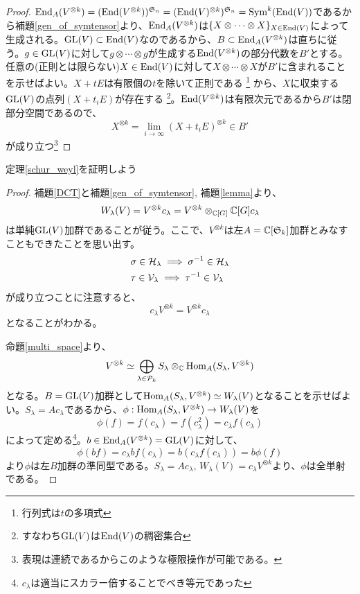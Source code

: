 \documentclass{ltjsreport}
\begin{document}
\begin{proof}
  $\text{End}_A(V^{\otimes k})=(\text{End}(V^{\otimes k}))^{\mathfrak{S}_n}=(\text{End}(V)^{\otimes k})^{\mathfrak{S}_n}=\text{Sym}^k(\text{End}(V))$であるから補題\ref{gen_of_symtensor}より、$\text{End}_A(V^{\otimes k})$は$\{X\otimes\cdots\otimes X\}_{X\in\text{End}(V)}$によって生成される。$\text{GL}(V)\subset\text{End}(V)$なのであるから、$B\subset \text{End}_A(V^{\otimes k})$は直ちに従う。$g\in\text{GL}(V)$に対して$g\otimes \cdots\otimes g$が生成する$\text{End}(V^{\otimes k})$の部分代数を$B'$とする。任意の(正則とは限らない)$X\in\text{End}(V)$に対して$X\otimes \cdots\otimes X$が$B'$に含まれることを示せばよい。$X+tE$は有限個の$t$を除いて正則である
  \footnote{
    行列式は$t$の多項式
  }
  から、$X$に収束する$\text{GL}(V)$の点列$(X+t_iE)$が存在する
  \footnote{
    すなわち$\text{GL}(V)$は$\text{End}(V)$の稠密集合
  }。$\text{End}(V^{\otimes k})$は有限次元であるから$B'$は閉部分空間であるので、
  \[
  X^{\otimes k}=\lim_{i\rightarrow\infty}(X+t_iE)^{\otimes k}\in B'  
  \]
  が成り立つ\footnote{
    表現は連続であるからこのような極限操作が可能である。
  }
\end{proof}

定理\ref{schur_weyl}を証明しよう
\begin{proof}
  補題\ref{DCT}と補題\ref{gen_of_symtensor}, 補題\ref{lemma}より、
  \[
  W_\lambda(V)=V^{\otimes k}c_\lambda=V^{\otimes k}\otimes_{\mathbb{C}[G]} \mathbb{C}[G]c_\lambda 
  \]
  は単純$\text{GL}(V)$加群であることが従う。ここで、$V^{\otimes k}$は左$A=\mathbb{C}[\mathfrak{S}_k]$加群とみなすこともできたことを思い出す。
  \begin{align*}
    &\sigma\in\mathcal{H}_\lambda\implies\sigma^{-1}\in\mathcal{H}_\lambda\\
    &\tau\in\mathcal{V}_\lambda\implies\tau^{-1}\in\mathcal{V}_\lambda
  \end{align*}
  が成り立つことに注意すると、
  \[
  c_\lambda V^{\otimes k}=V^{\otimes k}c_\lambda  
  \]
  となることがわかる。

  命題\ref{multi_space}より、
  \[
  V^{\otimes k}\simeq \bigoplus_{\lambda\in\mathcal{P}_k}S_\lambda\otimes_{\mathbb{C}}\text{Hom}_A(S_\lambda,V^{\otimes k})  
  \]
  となる。$B=\text{GL}(V)$加群として$\text{Hom}_A(S_\lambda,V^{\otimes k})\simeq W_\lambda(V)$となることを示せばよい。$S_\lambda=Ac_\lambda$であるから、$\phi:\text{Hom}_A(S_\lambda,V^{\otimes k})\rightarrow W_\lambda(V)$を
  \[
    \phi(f)=f(c_\lambda)=f(c_\lambda^2)=c_\lambda f(c_\lambda)
  \]
  によって定める\footnote{$c_\lambda$は適当にスカラー倍することでべき等元であった}。$b\in\text{End}_A(V^{\otimes k})=\text{GL}(V)$に対して、
  \[
  \phi(bf)=c_\lambda bf(c_\lambda)=b(c_\lambda f(c_\lambda))=b\phi(f)
  \]
  より$\phi$は左$B$加群の準同型である。$S_\lambda=Ac_\lambda$, $W_\lambda(V)=c_\lambda V^{\otimes k}$より、$\phi$は全単射である。
\end{proof}
\end{document}
